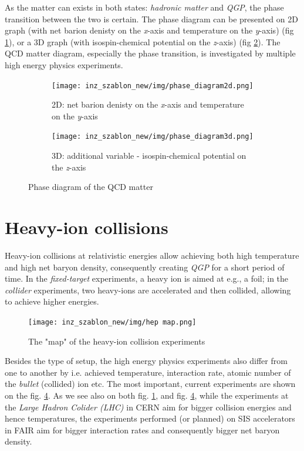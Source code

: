  As the matter can exists in both states: \emph{hadronic matter} and \emph{QGP}, the phase transition between the two is certain. The phase diagram can be presented on 2D graph (with net barion denisty on the \emph{x}-axis and temperature on the \emph{y}-axis) (fig \ref{phase 2d}), or a 3D graph (with isospin-chemical potential on the \emph{z}-axis) (fig \ref{phase 3d}). The QCD matter diagram, especially the phase transition, is investigated by multiple high energy physics experiments.
 \begin{figure}[H]
 \centering
    \begin{subfigure}[b]{0.49\linewidth} 
        \centering
        \texttt{[image: inz\_szablon\_new/img/phase\_diagram2d.png]}
        \caption{2D: net barion denisty on the \emph{x}-axis and temperature on the \emph{y}-axis \cite{progress report}}
        \label{phase 2d}
        \vspace{0.3cm}
    \end{subfigure}
     \hfill
       \begin{subfigure}[b]{0.49\linewidth}
        \centering
        \texttt{[image: inz\_szablon\_new/img/phase\_diagram3d.png]}
        \caption{3D: additional variable - isospin-chemical potential on the \emph{z}-axis \cite{nupecc}}
        \label{phase 3d} 
        \vspace{0.3cm}
    \end{subfigure}
    \caption{Phase diagram of the QCD matter}\label{bckgr}
\end{figure}
\section{Heavy-ion collisions}
Heavy-ion collisions at relativistic energies allow achieving both high temperature and high net baryon density, consequently  creating \emph{QGP} for a short period of time. In the \emph{fixed-target} experiments, a heavy ion is aimed at e.g., a foil; in the \emph{collider} experiments, two heavy-ions are accelerated and then collided, allowing to achieve higher energies.

\begin{figure}[H]
    \centering
    \texttt{[image: inz\_szablon\_new/img/hep map.png]}
    \caption{The "map" of the heavy-ion collision experiments \cite{hep map}}
    \label{hep experiments}
 \end{figure}

Besides the type of setup, the high energy physics experiments also differ from one to another by i.e. achieved temperature, interaction rate, atomic number of the \emph{bullet} (collided) ion etc. The most important, current experiments are shown on the fig. \ref{hep experiments}. As we see also on both fig. \ref{phase 2d}, and fig. \ref{hep experiments}, while the experiments at the \emph{Large Hadron Colider (LHC)} in CERN aim for bigger collision energies and hence temperatures\cite{alice}, the experiments performed (or planned) on SIS accelerators in FAIR aim for bigger interaction rates and consequently bigger net baryon density\cite{sis}.

